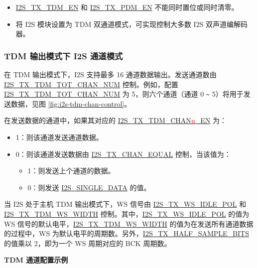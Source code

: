 \documentclass[main\_\_CN.tex]{subfiles}
\begin{document}
\begin{tiplisting}
\vspace{-2em}
\begin{itemize}
    \item \hyperref[fielddesc:I2STXTDMEN]{I2S\_TX\_TDM\_EN} 和 \hyperref[fielddesc:I2STXPDMEN]{I2S\_TX\_PDM\_EN} 不能同时置位或同时清零。 
    \item 将 I2S 模块设置为 TDM 双通道模式，可实现控制大多数 I2S 双声道编解码器。
    \end{itemize}
\end{tiplisting}

\subsubsection{TDM 输出模式下 I2S 通道模式} \label{sec:i2s-chan-control-tdm-mode}
在 TDM 输出模式下，I2S 支持最多 16 通道数据输出。发送通道数由 \hyperref[fielddesc:I2STXTDMTOTCHANNUM]{I2S\_TX\_TDM\_TOT\_CHAN\_NUM} 控制。例如，配置 \hyperref[fielddesc:I2STXTDMTOTCHANNUM]{I2S\_TX\_TDM\_TOT\_CHAN\_NUM} 为 5，则六个通道（通道 0 \verb+~+ 5）将用于发送数据，见图
\ref{fig:i2s-tdm-chan-control}。 

在发送数据的通道中，如果其对应的 \hyperref[fielddesc:I2STXTDMCHAN0EN]{I2S\_TX\_TDM\_CHAN{\textcolor{red}{n}}\_EN} 为：
\begin{itemize}
    \item 1：则该通道发送通道数据。
    \item 0：则该通道发送数据由 \hyperref[fielddesc:I2Ssec:i2s-tx-dataEQUAL]{I2S\_TX\_CHAN\_EQUAL} 控制，当该值为：
    \begin{itemize}
        \item 1：则发送上个通道的数据。
        \item 0：则发送 \hyperref[fielddesc:I2SSINGLEDATA]{I2S\_SINGLE\_DATA} 的值。
    \end{itemize}
\end{itemize}
当 I2S 处于主机 TDM 输出模式下，WS 信号由 \hyperref[fielddesc:I2STXWSIDLEPOL]{I2S\_TX\_WS\_IDLE\_POL} 和 \hyperref[fielddesc:I2STXTDMWSWIDTH]{I2S\_TX\_TDM\_WS\_WIDTH} 控制。其中，\hyperref[fielddesc:I2STXWSIDLEPOL]{I2S\_TX\_WS\_IDLE\_POL} 的值为 WS 信号的默认电平，\hyperref[fielddesc:I2STXTDMWSWIDTH]{I2S\_TX\_TDM\_WS\_WIDTH} 的值为在发送所有通道数据的过程中，WS 为默认电平的周期数。另外，\hyperref[fielddesc:I2STXHALFSAMPLEBITS]{I2S\_TX\_HALF\_SAMPLE\_BITS} 的值乘以 2，即为一个 WS 周期对应的 BCK 周期数。

\textbf{TDM 通道配置示例}
\end{document}
